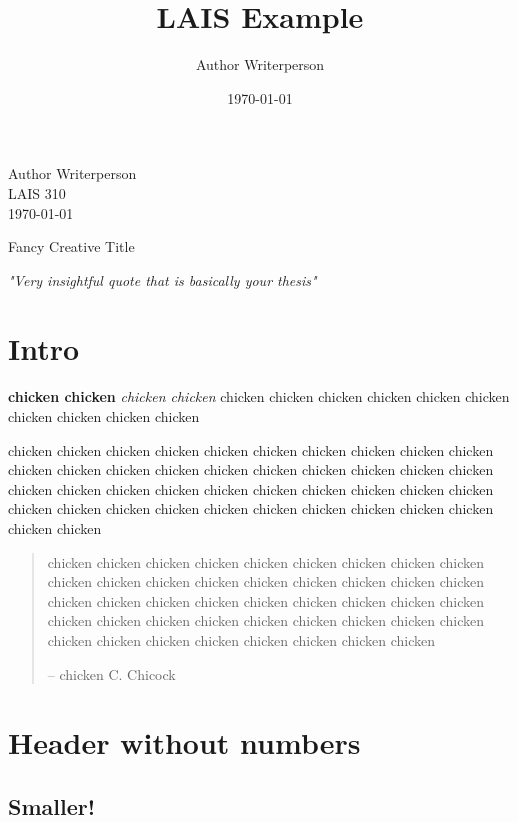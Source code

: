 \documentclass[]{article}
\title{LAIS Example}
\author{Author Writerperson}
\date{\today}
\begin{document}
\maketitle


\newpage

\singlespacing %

\begin{flushright}
    Author Writerperson \\
    LAIS 310 \\
    \today
\end{flushright}

\begin{center}
    \Huge
    Fancy Creative Title
\end{center}


\vspace{.5cm}

\textit{"Very insightful quote that is basically your thesis"}

\setcounter{page}{1}

\section{Intro}

\doublespacing %

\textbf{chicken chicken} \textit{chicken chicken} chicken chicken chicken chicken chicken chicken
chicken chicken chicken chicken

chicken chicken chicken chicken chicken chicken chicken chicken chicken chicken
chicken chicken chicken chicken chicken chicken chicken chicken chicken chicken
chicken chicken chicken chicken chicken chicken chicken chicken chicken chicken
chicken chicken chicken chicken chicken chicken chicken chicken chicken chicken
chicken chicken


\begin{quote}

    chicken chicken chicken chicken chicken chicken chicken chicken chicken
    chicken chicken chicken chicken chicken chicken chicken chicken chicken
    chicken chicken chicken chicken chicken chicken chicken chicken chicken
    chicken chicken chicken chicken chicken chicken chicken chicken chicken
    chicken chicken chicken chicken chicken chicken chicken chicken

   \hfill -- chicken C. Chicock

\end{quote}

\section*{Header without numbers}
\subsection*{Smaller!}
\end{document}
